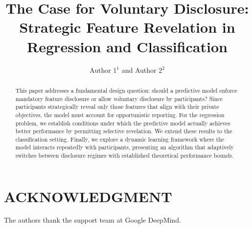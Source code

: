 \documentclass[letterpaper, 11pt]{article} %
\title{The Case for Voluntary Disclosure: Strategic Feature Revelation in Regression and Classification}
\author{Author 1$^{1}$ and Author 2$^{2}$}
\date{}
\begin{document}
\maketitle
\pagestyle{plain}

\begin{abstract}
This paper addresses a fundamental design question: should a predictive model enforce mandatory feature disclosure or allow voluntary disclosure by participants? Since participants strategically reveal only those features that align with their private objectives, the model must account for opportunistic reporting. For the regression problem, we establish conditions under which the predictive model actually achieves better performance by permitting selective revelation. We extend these results to the classification setting. Finally, we explore a dynamic learning framework where the model interacts repeatedly with participants, presenting an algorithm that adaptively switches between disclosure regimes with established theoretical performance bounds.
\end{abstract}












\section*{ACKNOWLEDGMENT}
The authors thank the support team at Google DeepMind.




\end{document}
